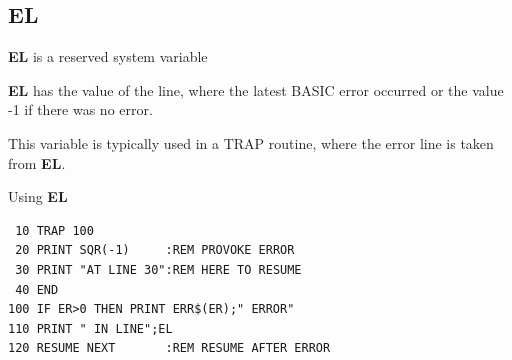 \subsection{EL}
\begin{description}[leftmargin=2cm,style=nextline]
\item [Format:] {\bf EL} is a reserved system variable
\item [Usage:]  {\bf EL} has the value of the line, where
               the latest BASIC error
               occurred or the value -1 if there was no error.

This variable is typically used in a TRAP routine,
where the error line is taken from {\bf EL}.

\item [Example:] Using {\bf EL}
\begin{tcolorbox}[colback=black,coltext=white]
\verbatimfont{\codefont}
\begin{verbatim}
 10 TRAP 100
 20 PRINT SQR(-1)     :REM PROVOKE ERROR
 30 PRINT "AT LINE 30":REM HERE TO RESUME
 40 END
100 IF ER>0 THEN PRINT ERR$(ER);" ERROR"
110 PRINT " IN LINE";EL
120 RESUME NEXT       :REM RESUME AFTER ERROR
\end{verbatim}
\end{tcolorbox}
\end{description}


\newpage
